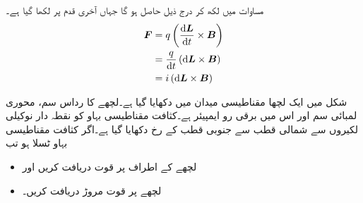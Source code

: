 مساوات   میں   لکھ کر درج ذیل حاصل ہو گا جہاں آخری قدم پر  لکھا گیا ہے۔
\begin{gather}
\begin{aligned}
\kvec{F}&=q \left(\frac{\dif \kvec{L}}{\dif t} \times \kvec{B} \right)\\
&=\frac{q}{\dif t} \left(\dif \kvec{L} \times \kvec{B} \right)\\
&=i \left(\dif \kvec{L} \times \kvec{B}  \right)
\end{aligned}
\end{gather}


شکل  میں ایک لچھا مقناطیسی میدان میں دکھایا گیا ہے۔لچھے کا رداس  سم، محوری لمبائی  سم اور اس میں برقی رو   ایمپیئر ہے۔کثافت مقناطیسی بہاو کو نقطہ دار نوکیلی لکیروں سے شمالی قطب سے جنوبی قطب کے رخ دکھایا گیا ہے۔اگر کثافت مقناطیسی بہاو  ٹسلا ہو تب
\begin{itemize}
\item
لچھے کے اطراف پر قوت دریافت کریں اور
\item
لچھے پر قوت مروڑ  دریافت کریں۔
\end{itemize}
